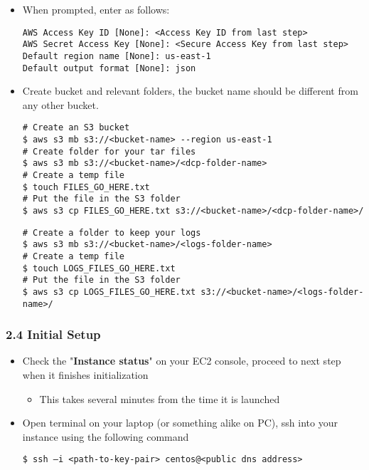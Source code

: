 \documentclass[]{article}
\begin{document}
\begin{itemize}
\item
  When prompted, enter as follows:

\begin{verbatim}
AWS Access Key ID [None]: <Access Key ID from last step>
AWS Secret Access Key [None]: <Secure Access Key from last step>
Default region name [None]: us-east-1
Default output format [None]: json
\end{verbatim}
\end{itemize}

\begin{itemize}
\item
  Create bucket and relevant folders, the bucket name should be
  different from any other bucket.

\begin{verbatim}
# Create an S3 bucket 
$ aws s3 mb s3://<bucket-name> --region us-east-1
# Create folder for your tar files
$ aws s3 mb s3://<bucket-name>/<dcp-folder-name> 
# Create a temp file
$ touch FILES_GO_HERE.txt    
# Put the file in the S3 folder
$ aws s3 cp FILES_GO_HERE.txt s3://<bucket-name>/<dcp-folder-name>/  
\end{verbatim}

\begin{verbatim}
# Create a folder to keep your logs
$ aws s3 mb s3://<bucket-name>/<logs-folder-name>  
# Create a temp file
$ touch LOGS_FILES_GO_HERE.txt    
# Put the file in the S3 folder
$ aws s3 cp LOGS_FILES_GO_HERE.txt s3://<bucket-name>/<logs-folder-name>/  
\end{verbatim}
\end{itemize}

\hypertarget{header-n266}{%
\subsubsection{2.4 Initial Setup}\label{header-n266}}

\begin{itemize}
\item
  Check the "\textbf{Instance status}" on your EC2 console, proceed to
  next step when it finishes initialization

  \begin{itemize}
  \item
    This takes several minutes from the time it is launched 
  \end{itemize}
\item
  Open terminal on your laptop (or something alike on PC), ssh into your
  instance using the following command

\begin{verbatim}
$ ssh –i <path-to-key-pair> centos@<public dns address>
\end{verbatim}
\end{itemize}
\end{document}
